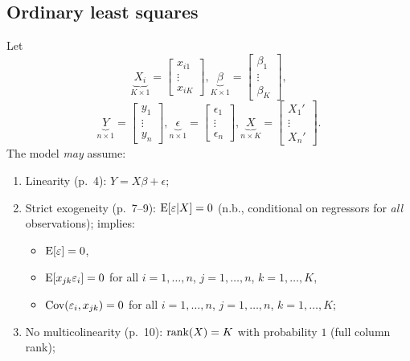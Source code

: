 \documentclass[8pt,letterpaper, landscape]{extarticle} %
\begin{document}
\begin{multicols}{3}
\begin{description}
\subsection{Ordinary least squares}
 Let
$$
\underbrace{X_i}_{K \times 1} = \begin{bmatrix} x_{i1} \\ \vdots \\ x_{iK} \end{bmatrix},
\underbrace{\beta}_{K \times 1} = \begin{bmatrix} \beta_{1} \\ \vdots \\ \beta_{K} \end{bmatrix},
$$
$$
\underbrace{Y}_{n \times 1} = \begin{bmatrix} y_{1} \\ \vdots \\ y_{n} \end{bmatrix},
\underbrace{\epsilon}_{n \times 1} = \begin{bmatrix} \epsilon_{1} \\ \vdots \\ \epsilon_{n} \end{bmatrix},
\underbrace{X}_{n \times K} = \begin{bmatrix} X_{1}' \\ \vdots \\ X_{n}' \end{bmatrix}.
$$
The model \textit{may} assume:
\begin{enumerate}
\item Linearity (p.~4): $ Y = X \beta + \epsilon $;
\item Strict exogeneity (p.~7--9): $ \operatorname{E} [\varepsilon | X] = 0 $ (n.b., conditional on regressors for \textit{all} observations); implies:
\begin{itemize}
\item $ \operatorname{E} [\varepsilon] = 0 $,
\item $ \operatorname{E} [x_{jk} \varepsilon_i] = 0 $ for all $ i = 1, \dotsc , n $, $ j = 1, \dotsc , n $, $ k = 1, \dotsc , K $,
\item $ \operatorname{Cov} (\varepsilon_i , x_{jk} ) = 0 $ for all $ i = 1, \dotsc , n $, $ j = 1, \dotsc , n $, $ k = 1, \dotsc , K $;
\end{itemize}
\item No multicolinearity (p.~10): $ \operatorname{rank}  (X) = K $ with probability $ 1 $ (full column rank);

\end{enumerate}
\end{description}
\end{multicols}
\end{document}

